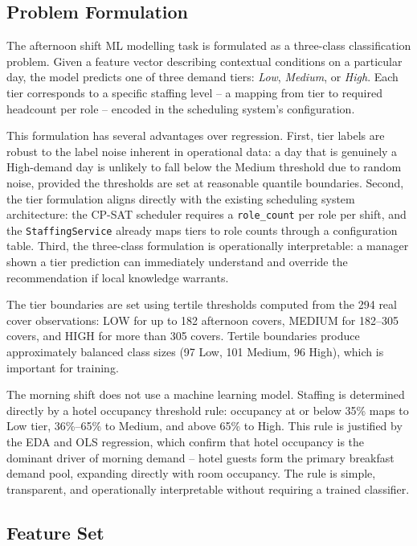 \documentclass[12pt,a4paper,oneside]{article}
\begin{document}
\subsection{Problem Formulation}

The afternoon shift ML modelling task is formulated as a three-class classification problem. Given a feature vector describing contextual conditions on a particular day, the model predicts one of three demand tiers: \textit{Low}, \textit{Medium}, or \textit{High}. Each tier corresponds to a specific staffing level -- a mapping from tier to required headcount per role -- encoded in the scheduling system's configuration.

This formulation has several advantages over regression. First, tier labels are robust to the label noise inherent in operational data: a day that is genuinely a High-demand day is unlikely to fall below the Medium threshold due to random noise, provided the thresholds are set at reasonable quantile boundaries. Second, the tier formulation aligns directly with the existing scheduling system architecture: the CP-SAT scheduler requires a \texttt{role\_count} per role per shift, and the \texttt{StaffingService} already maps tiers to role counts through a configuration table. Third, the three-class formulation is operationally interpretable: a manager shown a tier prediction can immediately understand and override the recommendation if local knowledge warrants.

The tier boundaries are set using tertile thresholds computed from the 294 real cover observations: LOW for up to 182 afternoon covers, MEDIUM for 182--305 covers, and HIGH for more than 305 covers. Tertile boundaries produce approximately balanced class sizes (97 Low, 101 Medium, 96 High), which is important for training.

The morning shift does not use a machine learning model. Staffing is determined directly by a hotel occupancy threshold rule: occupancy at or below 35\% maps to Low tier, 36\%--65\% to Medium, and above 65\% to High. This rule is justified by the EDA and OLS regression, which confirm that hotel occupancy is the dominant driver of morning demand -- hotel guests form the primary breakfast demand pool, expanding directly with room occupancy. The rule is simple, transparent, and operationally interpretable without requiring a trained classifier.

\subsection{Feature Set}
\end{document}
